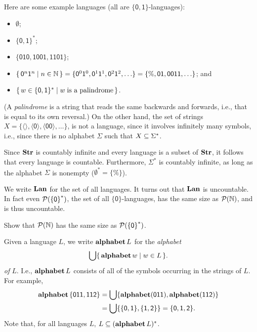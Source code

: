 Here are some example languages (all are $\mathsf{\{0,1\}}$-languages):
\begin{itemize}
\item $\emptyset$;

\item $\mathsf{\{0,1\}^*}$;

\item $\mathsf{\{010,1001,1101\}}$;

\item $\{ \, \mathsf{0}^n\mathsf{1}^n \mid n\in\mathbb{N} \, \} =
\{\mathsf{0}^0\mathsf{1}^0, \mathsf{0}^1\mathsf{1}^1, \mathsf{0}^2\mathsf{1}^2, \ldots\} =
\mathsf{\{\%, 01, 0011, \ldots\}}$; and

\item $\{ \, w\in\mathsf{\{0,1\}^*} \mid w\;\allowbreak\mbox{is a palindrome}\allowbreak \, \}$.
\end{itemize}
(A \emph{palindrome}
%
%
is a string that reads the same backwards and forwards,
i.e., that is equal to its own reversal.)
On the other hand, the set of strings
$X=\mathsf{\{\langle\rangle, \langle 0\rangle, \langle 00\rangle}, \ldots\}$,
is not a language, since it involves infinitely many symbols, i.e.,
since there is no alphabet $\Sigma$ such that $X\subseteq\Sigma^*$.

Since $\mathbf{Str}$ is countably infinite and every language is a subset
of $\mathbf{Str}$, it follows that every language is countable.
%
Furthermore, $\Sigma^*$ is countably infinite,
%
as long as the alphabet
$\Sigma$ is nonempty ($\emptyset^*=\{\%\}$).

We write $\mathbf{Lan}$
%
%
for the set of all languages.  It turns out that $\mathbf{Lan}$ is
uncountable.
%
In fact even
${\cal P} (\mathsf{\{0\}}^*)$, the set of all
$\mathsf{\{0\}}$-languages, has the same size as ${\cal P} (\mathbb{N})$,
and is thus uncountable.

\begin{exercise}
Show that ${\cal P} (\mathbb{N})$ has the same size as  ${\cal P} (\mathsf{\{0\}}^*)$.
\end{exercise}

Given a language $L$, we write $\mathbf{alphabet}\,L$
%
%
for the \emph{alphabet}
%
%
\begin{gather*}
\bigcup\{ \, \mathbf{alphabet}\,w \mid w\in L \, \} .
\end{gather*}
\emph{of} $L$.
I.e., $\mathbf{alphabet}\,L$ consists of all of the symbols occurring in the
strings of $L$.
For example,
\begin{align*}
\mathbf{alphabet}\,\mathsf{\{011,112\}} &=
\bigcup\{\mathbf{alphabet}(\mathsf{011}),\mathbf{alphabet}(\mathsf{112})\} \\
&= \bigcup\{\{\mathsf{0},\mathsf{1}\},\{\mathsf{1},\mathsf{2}\}\}
= \{\mathsf{0},\mathsf{1},\mathsf{2}\} .
\end{align*}
Note that, for all languages $L$, $L\subseteq(\mathbf{alphabet}\,L)^*$.

